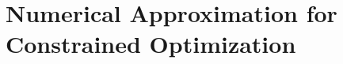 
\chapter{Numerical Approximation for Constrained Optimization}\label{chapter:ConstrainedNumerical}


